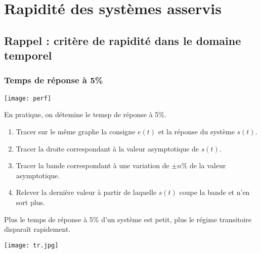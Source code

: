 \section{Rapidité des systèmes asservis}


\subsection{Rappel : critère de rapidité dans le domaine temporel}

\subsubsection{Temps de réponse à 5\%}

\begin{marginfigure}
\centering
\texttt{[image: perf]}
\end{marginfigure}

\begin{methode}%
En pratique, on détemine le temsp de réponse à 5\%.
\begin{enumerate}
\item Tracer sur le même graphe la consigne $e(t)$ et la réponse du système
$s(t)$.
\item Tracer la droite correspondant à la valeur asymptotique de $s(t)$.
\item Tracer la bande correspondant à une variation de $\pm n\%$ de la valeur
asymptotique.
\item Relever la dernière valeur à partir de laquelle $s(t)$ coupe la bande et
n'en sort plus.
\end{enumerate}
\end{methode}

\begin{resultat}
Plus le temps de réponse à 5\% d'un système est petit, plus le régime transitoire disparaît rapidement. 
\end{resultat}


\begin{marginfigure}[1cm]
\centering
\texttt{[image: tr.jpg]}
\end{marginfigure}

